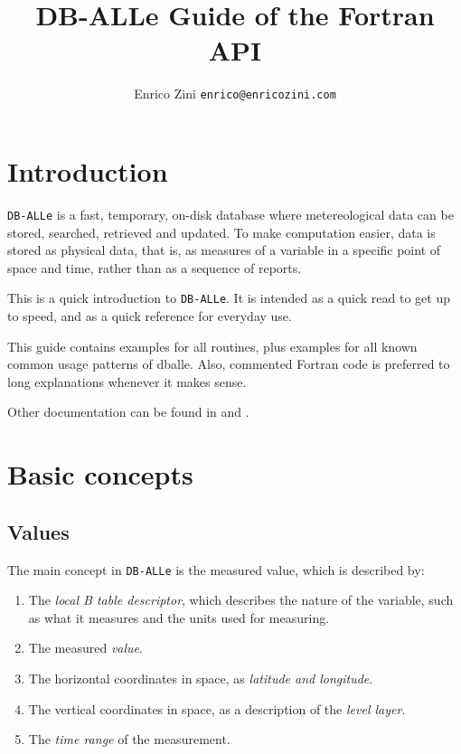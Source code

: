 \documentclass[draft,12pt,a4paper,twoside]{book}
\title{DB-ALLe Guide of the Fortran API}
\author{Enrico Zini \hfil {\tt enrico@enricozini.com}}
\newcommand{\dballe}{{\tt DB-ALLe}}
\begin{document}


\maketitle


\tableofcontents

\chapter {Introduction}
\label{ch-intro}

\dballe{} is a fast, temporary, on-disk database where metereological data can
be stored, searched, retrieved and updated.  To make computation easier, data
is stored as physical data, that is, as measures of a variable in a specific
point of space and time, rather than as a sequence of reports.

This is a quick introduction to \dballe{}.  It is intended as a quick read to
get up to speed, and as a quick reference for everyday use.


This guide contains examples for all routines, plus examples for all known
common usage patterns of dballe.  Also, commented Fortran code is preferred
to long explanations whenever it makes sense.

Other documentation can be found in \cite{UserGuide} and \cite{LibDoc}.

\chapter {Basic concepts}
\label{ch-concepts}

\section {Values}

The main concept in \dballe{} is the measured value, which is described by:

\begin{enumerate}
\item The \emph{local B table descriptor}, which describes the nature of the
      variable, such as what it measures and the units used for measuring.
\item The measured \emph{value}.
\item The horizontal coordinates in space, as \emph{latitude and longitude}.
\item The vertical coordinates in space, as a description of the \emph{level layer}.
\item The \emph{time range} of the measurement.
\end{enumerate}
\end{document}
